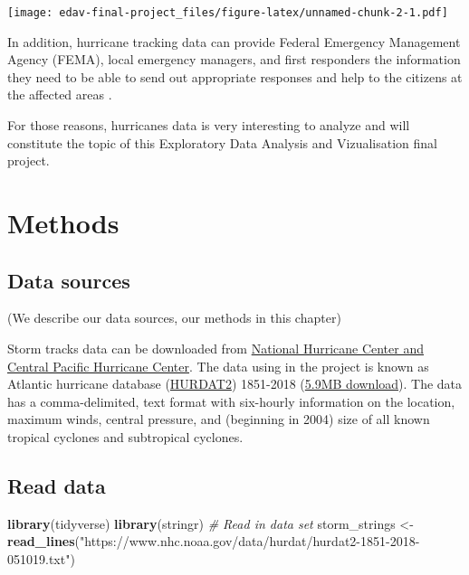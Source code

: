 \documentclass[]{book}
\newenvironment{Shaded}{\begin{snugshade}}{\end{snugshade}}
\newcommand{\CommentTok}[1]{\textcolor[rgb]{0.56,0.35,0.01}{\textit{#1}}}
\newcommand{\KeywordTok}[1]{\textcolor[rgb]{0.13,0.29,0.53}{\textbf{#1}}}
\newcommand{\NormalTok}[1]{#1}
\newcommand{\StringTok}[1]{\textcolor[rgb]{0.31,0.60,0.02}{#1}}
\begin{document}
\texttt{[image: edav-final-project\_files/figure-latex/unnamed-chunk-2-1.pdf]}

In addition, hurricane tracking data can provide Federal Emergency Management Agency (FEMA), local emergency managers, and first responders the information they need to be able to send out appropriate responses and help to the citizens at the affected areas \citep{Newtools4H2019}.

For those reasons, hurricanes data is very interesting to analyze and will constitute the topic of this Exploratory Data Analysis and Vizualisation final project.

\hypertarget{methods}{%
\chapter{Methods}\label{methods}}

\hypertarget{data-sources}{%
\section{Data sources}\label{data-sources}}

(We describe our data sources, our methods in this chapter)

Storm tracks data can be downloaded from \href{https://www.nhc.noaa.gov/data/\#hurdat}{National Hurricane Center and Central Pacific Hurricane Center}. The data using in the project is known as Atlantic hurricane database (\href{https://www.nhc.noaa.gov/data/hurdat/hurdat2-format-atlantic.pdf}{HURDAT2}) 1851-2018 (\href{https://www.nhc.noaa.gov/data/hurdat/hurdat2-1851-2018-051019.txt}{5.9MB download}). The data has a comma-delimited, text format with six-hourly information on the location, maximum winds, central pressure, and (beginning in 2004) size of all known tropical cyclones and subtropical cyclones.

\hypertarget{read-data}{%
\section{Read data}\label{read-data}}

\begin{Shaded}
\begin{Highlighting}[]
\KeywordTok{library}\NormalTok{(tidyverse)}
\KeywordTok{library}\NormalTok{(stringr)}
\CommentTok{# Read in data set}
\NormalTok{storm_strings <-}\StringTok{ }\KeywordTok{read_lines}\NormalTok{(}\StringTok{"https://www.nhc.noaa.gov/data/hurdat/hurdat2-1851-2018-051019.txt"}\NormalTok{)}
\end{Highlighting}
\end{Shaded}
\end{document}
